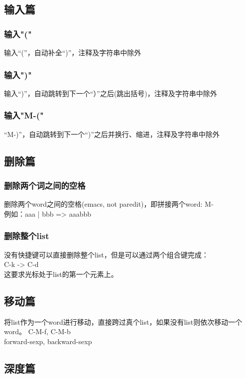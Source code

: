 ﻿\documentclass[a4paper,11pt]{article}
\begin{document}
  \subsection[输入篇]{输入篇}
  \subsubsection[输入"("]{输入"("}
  输入“(”，自动补全“)”，注释及字符串中除外
  \subsubsection[输入")"]{输入")"}
  输入“)”，自动跳转到下一个“）”之后(跳出括号)，注释及字符串中除外
  \subsubsection[输入"M-("]{输入"M-("}
  “M-)”，自动跳转到下一个“)”之后并换行、缩进，注释及字符串中除外

  \subsection[删除篇]{删除篇}
  \subsubsection[删除两个词之间的空格]{删除两个词之间的空格}
  删除两个word之间的空格(emacs, not paredit)，即拼接两个word: M-\bs \\
  例如：aaa  |   bbb => aaabbb
  \subsubsection[删除整个list]{删除整个list}
  没有快捷键可以直接删除整个list，但是可以通过两个组合键完成：\\
  C-k -> C-d\\
  这要求光标处于list的第一个元素上。

  \subsection[移动篇]{移动篇}
  将list作为一个word进行移动，直接跨过真个list，如果没有list则依次移动一个word。
  C-M-f, C-M-b\\
  forward-sexp, backward-sexp\\
  
  \subsection[深度篇]{深度篇}
\end{document}
